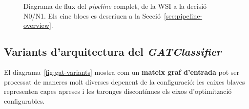 \documentclass[10pt,a4paper,twocolumn,twoside]{article}
\begin{document}
\begin{figure}[H]
\caption{Diagrama de flux del \textit{pipeline} complet, de la WSI a la decisió N0/N1. Els cinc
blocs es descriuen a la Secció~\ref{sec:pipeline-overview}.}
\label{fig:pipeline-full}
\end{figure}

\newpage

\subsection{Variants d'arquitectura del \textit{GATClassifier}}
\label{app:model-variants}

El diagrama~\ref{fig:gat-variants} mostra com un \textbf{mateix graf d'entrada}
pot ser processat de maneres molt diverses depenent de la configuració: les
caixes blaves representen capes apreses i les taronges discontínues els eixos
d'optimització configurables.
\end{document}
